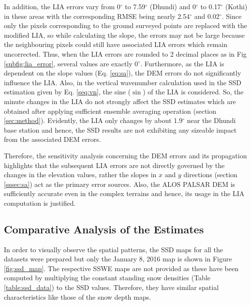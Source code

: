 \documentclass[12pt]{elsarticle}
\numberwithin{equation}{section}
\numberwithin{figure}{section}
\numberwithin{table}{section}
\begin{document}
In addition, the LIA errors vary from 0$^\circ$ to 7.59$^\circ$ (Dhundi) and 0$^\circ$ to 0.17$^\circ$ (Kothi) in these areas with the corresponding RMSE being nearly 2.54$^\circ$ and 0.02$^\circ$. Since only the pixels corresponding to the ground surveyed points are replaced with the modified LIA, so while calculating the slope, the errors may not be large because the neighbouring pixels could still have associated LIA errors which remain uncorrected. Thus, when the LIA errors are rounded to 2 decimal places as in Fig \ref{subfig:lia_error}, several values are exactly 0$^\circ$. Furthermore, as the LIA is dependent on the slope values (Eq. \eqref{eq:sa}), the DEM errors do not significantly influence the LIA. Also, in the vertical wavenumber calculation used in the SSD estimation given by Eq. \eqref{seq:vn}, the sine ($\sin$) of the LIA is considered. So, the minute changes in the LIA do not strongly affect the SSD estimates which are obtained after applying sufficient ensemble averaging operation (section \ref{sec:method}). Evidently, the LIA only changes by about 1.9$^\circ$ near the Dhundi base station and hence, the SSD results are not exhibiting any sizeable impact from the associated DEM errors.

Therefore, the sensitivity analysis concerning the DEM errors and its propagation highlights that the subsequent LIA errors are not directly governed by the changes in the elevation values, rather the slopes in $x$ and $y$ directions (section \ref{sssec:sa}) act as the primary error sources. Also, the ALOS PALSAR DEM is sufficiently accurate even in the complex terrains and hence, its usage in the LIA computation is justified.
\FloatBarrier
\subsection{Comparative Analysis of the Estimates}
\label{ssec:snow}

In order to visually observe the spatial patterns, the SSD maps for all the datasets were prepared but only the January 8, 2016 map is shown in Figure \ref{fig:ssd_map}. The respective SSWE maps are not provided as these have been computed by multiplying the constant standing snow densities (Table \ref{table:ssd_data}) to the SSD values. Therefore, they have similar spatial characteristics like those of the snow depth maps.
\end{document}
